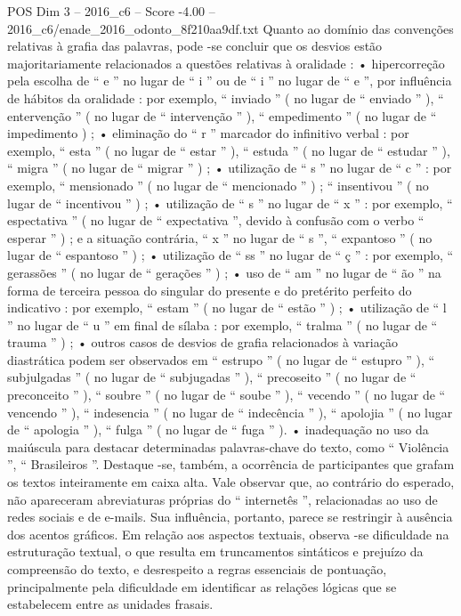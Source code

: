\begin{textsample}{POS Dim 3 – 2016\_c6 – Score -4.00 – 2016\_c6/enade\_2016\_odonto\_8f210aa9df.txt}
Quanto ao domínio das convenções relativas à grafia das palavras, pode -se concluir que os desvios estão majoritariamente relacionados a questões relativas à oralidade : • hipercorreção pela escolha de “ e ” no lugar de “ i ” ou de “ i ” no lugar de “ e ”, por influência de hábitos da oralidade : por exemplo, “ inviado ” ( no lugar de “ enviado ” ), “ entervenção ” ( no lugar de “ intervenção ” ), “ empedimento ” ( no lugar de “ impedimento ) ; • eliminação do “ r ” marcador do infinitivo verbal : por exemplo, “ esta ” ( no lugar de “ estar ” ), “ estuda ” ( no lugar de “ estudar ” ), “ migra ” ( no lugar de “ migrar ” ) ; • utilização de “ s ” no lugar de “ c ” : por exemplo, “ mensionado ” ( no lugar de “ mencionado ” ) ; “ insentivou ” ( no lugar de “ incentivou ” ) ; • utilização de “ s ” no lugar de “ x ” : por exemplo, “ espectativa ” ( no lugar de “ expectativa ”, devido à confusão com o verbo “ esperar ” ) ; e a situação contrária, “ x ” no lugar de “ s ”, “ expantoso ” ( no lugar de “ espantoso ” ) ; • utilização de “ ss ” no lugar de “ ç ” : por exemplo, “ gerassões ” ( no lugar de “ gerações ” ) ; • uso de “ am ” no lugar de “ ão ” na forma de terceira pessoa do singular do presente e do pretérito perfeito do indicativo : por exemplo, “ estam ” ( no lugar de “ estão ” ) ; • utilização de “ l ” no lugar de “ u ” em final de sílaba : por exemplo, “ tralma ” ( no lugar de “ trauma ” ) ; • outros casos de desvios de grafia relacionados à variação diastrática podem ser observados em “ estrupo ” ( no lugar de “ estupro ” ), “ subjulgadas ” ( no lugar de “ subjugadas ” ), “ precoseito ” ( no lugar de “ preconceito ” ), “ soubre ” ( no lugar de “ soube ” ), “ vecendo ” ( no lugar de “ vencendo ” ), “ indesencia ” ( no lugar de “ indecência ” ), “ apolojia ” ( no lugar de “ apologia ” ), “ fulga ” ( no lugar de “ fuga ” ). • inadequação no uso da maiúscula para destacar determinadas palavras-chave do texto, como “ Violência ”, “ Brasileiros ”.
Destaque -se, também, a ocorrência de participantes que grafam os textos inteiramente em caixa alta.
Vale observar que, ao contrário do esperado, não apareceram abreviaturas próprias do “ internetês ”, relacionadas ao uso de redes sociais e de e-mails.
Sua influência, portanto, parece se restringir à ausência dos acentos gráficos.
Em relação aos aspectos textuais, observa -se dificuldade na estruturação textual, o que resulta em truncamentos sintáticos e prejuízo da compreensão do texto, e desrespeito a regras essenciais de pontuação, principalmente pela dificuldade em identificar as relações lógicas que se estabelecem entre as unidades frasais.

\end{textsample}
